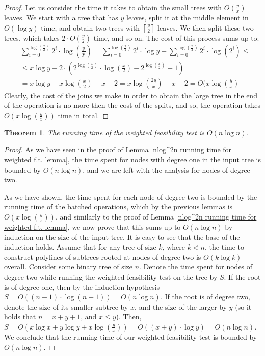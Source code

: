 \documentclass[11pt,a4paper]{article}
\newcommand{\ceil}[1]{\left\lceil #1 \right\rceil}
\newtheorem{theorem}{Theorem}[section]
\theoremstyle{definition}
\theoremstyle{remark}
\begin{document}
\begin{proof}
Let us consider the time it takes to obtain the small trees with $O(\frac{y}{x})$ leaves. We start with a tree that has $y$ leaves, split it at the middle element in $O(\log y)$ time, and obtain two trees with $\ceil{\frac{y}{2}}$ leaves. We then split these two trees, which takes $2 \cdot O(\frac{y}{2})$ time, and so on. The cost of this process sums up to:
\begin{align*}
& \sum_{i=0}^{\log (\frac{x}{2})} 2^i \cdot \log (\frac{y}{2^i}) = \sum_{i=0}^{\log (\frac{x}{2})} 2^i \cdot \log y - \sum_{i=0}^{\log (\frac{x}{2})} 2^i \cdot \log (2^i) \leq \\
& \leq x \log y - 2 \cdot (2^{ \log ( \frac{x}{2})} \cdot \log ( \frac{x}{2}) - 2^{ \log ( \frac{x}{2})}+1) = \\
& = x \log y  -  x \log (\frac{x}{2}) - x - 2 = x \log (\frac{2y}{x}) - x -2 = O(x \log (\frac{y}{x}) 
\end{align*}
Clearly, the cost of the joins we make in order to obtain the large tree in the end of the operation is no more then the cost of the splits, and so, the operation takes $O(x \log (\frac{y}{x}))$ time in total.
\end{proof}

\begin{theorem}
The running time of the weighted feasibility test is $O(n \log n)$.
\end{theorem}
\begin{proof}
As we have seen in the proof of Lemma \ref{nlog^2n running time for weighted f.t. lemma}, the time spent for nodes with degree one in the input tree is bounded by $O(n \log n)$, and we are left with the analysis for nodes of degree two.

As we have shown, the time spent for each node of degree two is bounded by the running time of the batched operations, which by the previous lemmas is $O(x \log (\frac{y}{x}))$, and similarly to the proof of Lemma \ref{nlog^2n running time for weighted f.t. lemma}, we now prove that this sums up to $O(n \log n)$ by induction on the size of the input tree. It is easy to see that the base of the induction holds. Assume that for any tree of size $k$, where $k<n$, the time to construct polylines of subtrees rooted at nodes of degree two is $O(k \log k)$ overall. Consider some binary tree of size $n$. Denote the time spent for nodes of degree two while running the weighted feasibility test on the tree by $S$. If the root is of degree one, then by the induction hypothesis $S=O((n-1)\cdot \log(n-1))=O(n \log n)$. If the root is of degree two, denote the size of its smaller subtree by $x$, and the size of the larger by $y$ (so it holds that $n=x+y+1$, and $x \leq y$). Then, $S= O(x \log x + y \log y + x \log (\frac{y}{x})) = O((x+y) \cdot \log y) = O(n \log n)$. We conclude that the running time of our weighted feasibility test is bounded by $O(n \log n)$.
\end{proof}



\end{document}
